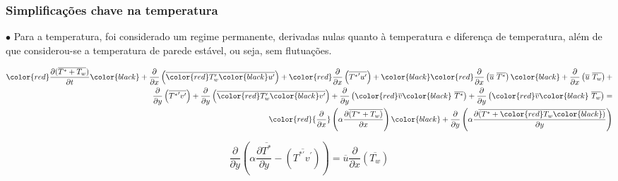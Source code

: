 \documentclass[xcolor=dvipsnames,10pt,aspectratio=169]{beamer}
\begin{document}
		\begin{frame}
		\frametitle{Simplificações chave na temperatura}
		$\bullet$ Para a temperatura, foi considerado um regime permanente, derivadas nulas quanto à temperatura e diferença de temperatura, além de que considerou-se a temperatura de parede estável, ou seja, sem flutuações. 
	 	\begin{center}
	 	\begin{equation*}
	 		\begin{split}
	 		\color{red}\frac{\partial ( \overline{ T^\ast + T_w } ) }{\partial t} \color{black} +
	 		\frac{\partial{}}{\partial{x}} \left(\overline{ \color{red}T_w^{\prime} \color{black} u^{\prime}}\right) +
	 		\color{red}\frac{\partial{}}{\partial{x}} \left(\overline{{T^{\ast}}^{\prime} u^{\prime}}\right)+ \color{black}
	 		\color{red} \frac{\partial{}}{\partial{x}}\left(\overline{u} \ \overline{T^{\ast}}\right) \color{black}+ 
	 		\frac{\partial{}}{\partial{x}}\left(\overline{u} \ \overline{T_w}\right)+ 
	 		\\
	 		\frac{\partial{}}{\partial{y}} \left(\overline{{T^{\ast}}^{\prime} v^{\prime}}\right)+
	 		\frac{\partial{}}{\partial{y}} \left(\overline{\color{red}T_w^\prime \color{black} v^\prime}\right) + \frac{\partial{}}{\partial{y}}\left(\color{red}\overline{v} \color{black} \ \overline{T^\ast}\right) +
	 		\frac{\partial{}}{\partial{y}}\left(\color{red}\overline{v}\color{black} \ \overline{T_w}\right) 
	 		= 
	 		\\
	 		\color{red}{\frac{\partial{}}{\partial{x}}} \left(\alpha {\frac{\partial{\overline{(T^\ast + T_w)}}}{\partial{x}}} \right) \color{black}+
	 		{\frac{\partial{}}{\partial{y}}} \left(\alpha {\frac{\partial{\overline{(T^\ast + \color{red} T_w \color{black})}}}{\partial{y}}} \right) 
	 		\end{split}
	 	\end{equation*}
 		\end{center}
 		\begin{equation}\label{equation_var}
 			{\frac{\partial{}}{\partial{y}}} \left(\alpha {\frac{\partial{\overline{T^\ast}}}{\partial{y}}}   
 			- \left(\overline{ T^{\ast\prime} v^\prime}\right) \right)
 			= 
 			\overline{u}\frac{\partial{}}{\partial{x}}\left(\overline{T_w}\right)  
 		\end{equation}
		\end{frame}
	
		
		
		
		
\end{document}
